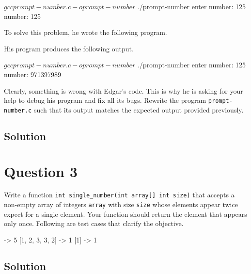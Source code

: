 \documentclass[12pt,letterpaper,twoside]{article}
\begin{document}
\begin{terminal}
$ gcc prompt-number.c -o prompt-number
$ ./prompt-number
enter number: 125
number: 125
\end{terminal}

To solve this problem, he wrote the following program.

\lstset{language=c,tabsize=4}


His program produces the following output.

\begin{terminal}
$ gcc prompt-number.c -o prompt-number
$ ./prompt-number
enter number: 125
number: 971397989
\end{terminal}

\newpage

Clearly, something is wrong with Edgar's code.
This is why he is asking for your help to debug his program and fix all its bugs.
Rewrite the program \texttt{prompt-number.c} such that its output matches the expected output provided previously.

\subsection*{Solution}

\lstset{language=c,tabsize=4}


\newpage

\section*{Question 3}

Write a function \texttt{int single\_number(int array[] int size)} that accepts a non-empty array of integers \texttt{array} with size \texttt{size} whose elements appear twice expect for a single element.
Your function should return the element that appears only once.
Following are test cases that clarify the objective.

\begin{terminal}
[1, -1, 4, 5, 4, 1, -1] -> 5
[1, 2, 3, 3, 2] -> 1
[1] -> 1
\end{terminal}

\subsection*{Solution}

\lstset{language=c,tabsize=4}

\end{document}
